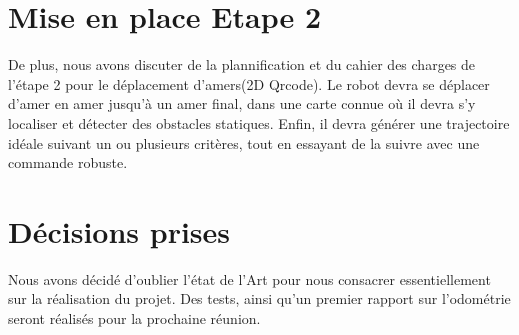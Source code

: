\documentclass[a4wide,10pt]{article}
\begin{document}
\section*{Mise en place Etape 2}

De plus, nous avons discuter de la plannification et du cahier des charges de l'étape 2 pour le déplacement d'amers(2D Qrcode). Le robot devra se déplacer d'amer en amer jusqu'à un amer final, dans une carte connue où il devra s'y localiser et détecter des obstacles statiques. Enfin, il devra générer une trajectoire idéale suivant un ou plusieurs critères, tout en essayant de la suivre avec une commande robuste. 


\section*{Décisions prises}

Nous avons décidé d'oublier l'état de l'Art pour nous consacrer essentiellement sur la réalisation du projet. Des tests, ainsi qu'un premier rapport sur l'odométrie seront réalisés pour la prochaine réunion.


\subsection*{\color{red}{Prochaine réunion : Vendredi 20 janvier 2017 (14h-15h)}}
\end{document}
